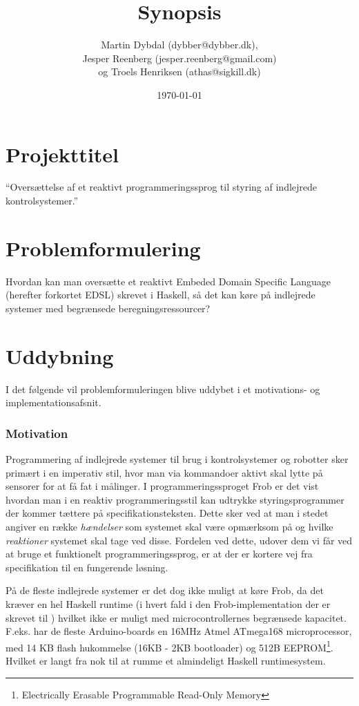 \documentclass[a4paper,oneside, draft]{memoir}
\title{Synopsis}
\author{Martin Dybdal (dybber@dybber.dk), \\
Jesper Reenberg (jesper.reenberg@gmail.com) \\ og
Troels Henriksen (athas@sigkill.dk)}
\date{\today}
\newcommand{\EDSL}{Embeded Domain Specific Language (herefter forkortet
  EDSL) \renewcommand{\EDSL}{ EDSL }}
\begin{document}
\maketitle

\section{Projekttitel}
"`Oversættelse af et reaktivt programmeringssprog til styring af
indlejrede kontrolsystemer."'

\section{Problemformulering}
Hvordan kan man oversætte et reaktivt \EDSL skrevet i Haskell, så det
kan køre på indlejrede systemer med begrænsede beregningsressourcer?

\section{Uddybning}

I det følgende vil problemformuleringen blive uddybet i et motivations- og
implementationsafsnit.

\subsubsection{Motivation}
Programmering af indlejrede systemer til brug i kontrolsystemer og robotter sker
primært i en imperativ stil, hvor man via kommandoer aktivt skal lytte på
sensorer for at få fat i målinger. I programmeringssproget Frob\cite{frob99} er
det vist hvordan man i en reaktiv programmeringsstil kan udtrykke
styringsprogrammer der kommer tættere på specifikationsteksten. Dette sker ved
at man i stedet angiver en række \textit{hændelser} som systemet skal være
opmærksom på og hvilke \textit{reaktioner} systemet skal tage ved
disse. Fordelen ved dette, udover dem vi får ved at bruge et funktionelt
programmeringssprog, er at der er kortere vej fra specifikation til en
fungerende løsning.

På de fleste indlejrede systemer er det dog ikke muligt at køre Frob, da det
kræver en hel Haskell runtime (i hvert fald i den Frob-implementation der er
skrevet til \cite{frob99}) hvilket ikke er muligt med microcontrollernes
begrænsede kapacitet.  F.eks. har de fleste Arduino-boards \cite{arduino} en
16MHz Atmel ATmega168 microprocessor, med 14 KB flash hukommelse (16KB - 2KB
bootloader) og 512B EEPROM\footnote{Electrically Erasable Programmable Read-Only
  Memory}. Hvilket er langt fra nok til at rumme et almindeligt Haskell
runtimesystem.
\end{document}

